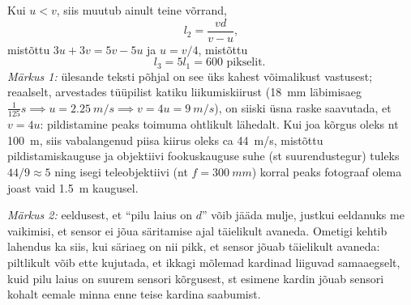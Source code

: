 Kui $u < v$, siis muutub ainult teine võrrand,
\[
l_2 = \frac{vd}{v - u},
\]
mistõttu $3u + 3v = 5v - 5u$ ja $u = v/4$, mistõttu
\[
l_{3}=5 l_{1}=600 \text { pikselit. }
\]
\emph{Märkus 1:} ülesande teksti põhjal on see üks kahest võimalikust vastusest; reaalselt, arvestades tüüpilist katiku liikumiskiirust (\SI{18}{mm} läbimisaeg $\frac{1}{125}\si{s} \implies u = \SI{2,25}{m/s} \implies v = 4u = \SI{9}{m/s}$), on siiski üsna raske saavutada, et $v = 4u$: pildistamine peaks toimuma ohtlikult lähedalt. Kui joa kõrgus oleks nt \SI{100}{m}, siis vabalangenud piisa
kiirus oleks ca \SI{44}{m/s}, mistõttu pildistamiskauguse ja objektiivi fookuskauguse suhe
(st suurendustegur) tuleks $44/9 \approx 5$ ning isegi teleobjektiivi (nt $f = \SI{300}{mm}$) korral
peaks fotograaf olema joast vaid \SI{1,5}{m} kaugusel.

\emph{Märkus 2:} eeldusest, et \enquote{pilu laius on $d$} võib jääda mulje, justkui eeldanuks me
vaikimisi, et sensor ei jõua säritamise ajal täielikult avaneda. Ometigi kehtib lahendus
ka siis, kui säriaeg on nii pikk, et sensor jõuab täielikult avaneda: piltlikult võib
ette kujutada, et ikkagi mõlemad kardinad liiguvad samaaegselt, kuid pilu laius on
suurem sensori kõrgusest, st esimene kardin jõuab sensori kohalt eemale minna enne
teise kardina saabumist.
\probend
